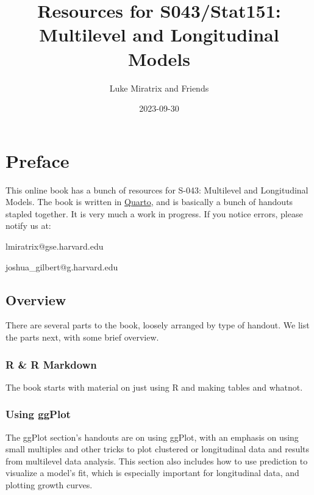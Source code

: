 \documentclass[
  letterpaper,
  DIV=11,
  numbers=noendperiod]{scrreprt}
\title{Resources for S043/Stat151: Multilevel and Longitudinal Models}
\author{Luke Miratrix and Friends}
\date{2023-09-30}
\renewcommand*\contentsname{Table of contents}
\newcommand\contentsname{Table of contents}
\begin{document}
\maketitle
\renewcommand*\contentsname{Table of contents}
{
\hypersetup{linkcolor=}
\setcounter{tocdepth}{2}
\tableofcontents
}

\hypertarget{preface}{%
\chapter*{Preface}\label{preface}}


This online book has a bunch of resources for S-043: Multilevel and
Longitudinal Models. The book is written in
\href{https://quarto.org/}{Quarto}, and is basically a bunch of handouts
stapled together. It is very much a work in progress. If you notice
errors, please notify us at:

lmiratrix@gse.harvard.edu

joshua\_gilbert@g.harvard.edu

\hypertarget{overview}{%
\section*{Overview}\label{overview}}


There are several parts to the book, loosely arranged by type of
handout. We list the parts next, with some brief overview.

\hypertarget{r-r-markdown}{%
\subsection*{R \& R Markdown}\label{r-r-markdown}}

The book starts with material on just using R and making tables and
whatnot.

\hypertarget{using-ggplot}{%
\subsection*{Using ggPlot}\label{using-ggplot}}

The ggPlot section's handouts are on using ggPlot, with an emphasis on
using small multiples and other tricks to plot clustered or longitudinal
data and results from multilevel data analysis. This section also
includes how to use prediction to visualize a model's fit, which is
especially important for longitudinal data, and plotting growth curves.
\end{document}
